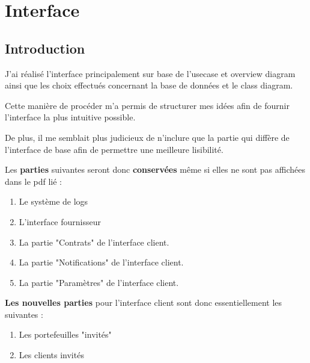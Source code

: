 \section{Interface}

\subsection{Introduction}

J'ai réalisé l'interface principalement sur base de l'usecase et overview diagram ainsi que les choix effectués concernant la base de données et le class diagram.

\begin{flushleft}
Cette manière de procéder m'a permis de structurer mes idées afin de fournir l'interface la plus intuitive possible.
\end{flushleft}

\begin{flushleft}
De plus, il me semblait plus judicieux de n'inclure que la partie qui diffère de l'interface de base afin de permettre une meilleure lisibilité.
\end{flushleft}

\begin{flushleft}
Les \textbf{parties} suivantes seront donc \textbf{conservées} même si elles ne sont pas affichées dans le pdf lié :
\end{flushleft}

\begin{enumerate}[1.]
\item Le système de logs
\item L'interface fournisseur
\item La partie "Contrats" de l'interface client.
\item La partie "Notifications" de l'interface client.
\item La partie "Paramètres" de l'interface client.
\end{enumerate}

\begin{flushleft}
\textbf{Les nouvelles parties} pour l'interface client sont donc essentiellement les suivantes :
\end{flushleft}

\begin{enumerate}[1.]
\item Les portefeuilles "invités"
\item Les clients invités
\end{enumerate}

